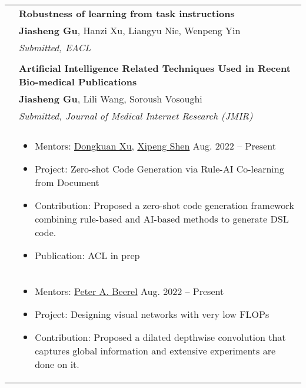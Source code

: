 \documentclass[letterpaper, 10pt]{article}
\begin{document}
\begin{longtable}{p{1.3in}p{4.8in}}
& \textbf{Robustness of learning from task instructions \label{robustness_instruction}} \\
& \textbf{Jiasheng Gu}, Hanzi Xu, Liangyu Nie, Wenpeng Yin \\
& \textit{Submitted, EACL}\\
& \\

& \textbf{Artificial Intelligence Related Techniques Used in Recent Bio-medical Publications} \label{JMIR} \\
& \textbf{Jiasheng Gu}, Lili Wang, Soroush Vosoughi \\
& \textit{Submitted, Journal of Medical Internet Research (JMIR)}\\
& \\


\nohyphens{\color{black}{Research Experience}} 

&  \begin{itemize}[leftmargin=10pt, itemsep=-5pt, topsep=0pt,before=\textbf{North Carolina State University}]
    \item Mentors: \href{http://personal.psu.edu/dux19/}{Dongkuan Xu}, \href{https://people.engr.ncsu.edu/xshen5/}{Xipeng Shen} \hfill Aug. 2022 -- Present 
    \item Project: Zero-shot Code Generation via Rule-AI Co-learning from Document
    \item Contribution: Proposed a zero-shot code generation framework combining rule-based and AI-based methods to generate DSL code.
    \item Publication: ACL in prep
  \end{itemize}\\ 

&  \begin{itemize}[leftmargin=10pt, itemsep=-5pt, topsep=0pt,before=\textbf{University of Southern California}]
    \item Mentors: \href{https://sites.usc.edu/eessc/people/}{Peter A. Beerel} \hfill Aug. 2022 -- Present 
    \item Project: Designing visual networks with very low FLOPs
    \item Contribution: Proposed a dilated depthwise convolution that captures global information and extensive experiments are done on it.
  \end{itemize}\\ 
  


\end{longtable}
\end{document}
